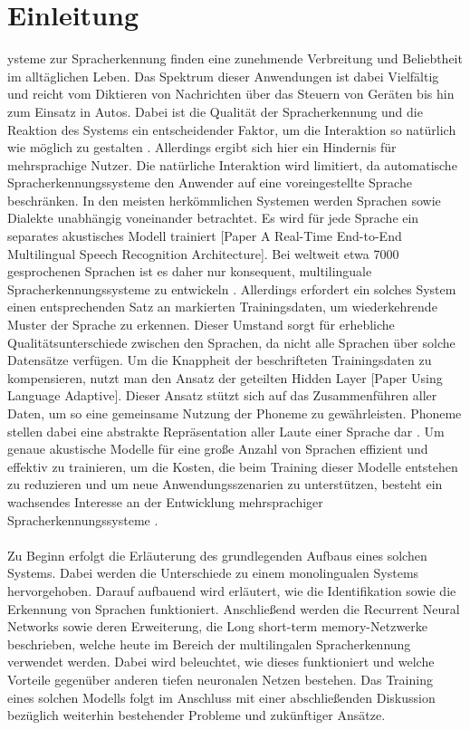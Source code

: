 \section{Einleitung}\label{sec:introduction}
ysteme zur Spracherkennung finden eine zunehmende Verbreitung und Beliebtheit im alltäglichen Leben. Das Spektrum dieser Anwendungen ist dabei Vielfältig und reicht vom Diktieren von Nachrichten über das Steuern von Geräten bis hin zum Einsatz in Autos. Dabei ist die Qualität der Spracherkennung und die Reaktion des Systems ein entscheidender Faktor, um die Interaktion so natürlich wie möglich zu gestalten \cite{Yu.2014}. Allerdings ergibt sich hier ein Hindernis für mehrsprachige Nutzer. Die natürliche Interaktion wird limitiert, da automatische Spracherkennungssysteme den Anwender auf eine voreingestellte Sprache beschränken. In den meisten herkömmlichen Systemen werden Sprachen sowie Dialekte unabhängig voneinander betrachtet. Es wird für jede Sprache ein separates akustisches Modell trainiert [Paper A Real-Time End-to-End Multilingual Speech Recognition Architecture]. Bei weltweit etwa 7000 gesprochenen Sprachen ist es daher nur konsequent, multilinguale Spracherkennungssysteme zu entwickeln \cite{Gary.2018}. Allerdings erfordert ein solches System einen entsprechenden Satz an markierten Trainingsdaten, um wiederkehrende Muster der Sprache zu erkennen. 
Dieser Umstand sorgt für erhebliche Qualitätsunterschiede zwischen den Sprachen, da nicht alle Sprachen über solche Datensätze verfügen. Um die Knappheit der beschrifteten Trainingsdaten zu kompensieren, nutzt man den Ansatz der geteilten Hidden Layer [Paper Using Language Adaptive]. Dieser Ansatz stützt sich auf das Zusammenführen aller Daten, um so eine gemeinsame Nutzung der Phoneme zu gewährleisten.  Phoneme stellen dabei eine abstrakte Repräsentation aller Laute einer Sprache dar . Um genaue akustische Modelle für eine große Anzahl von Sprachen effizient und effektiv zu trainieren, um die Kosten, die beim Training dieser Modelle entstehen zu reduzieren und um neue Anwendungsszenarien zu unterstützen, besteht ein wachsendes Interesse an der Entwicklung mehrsprachiger Spracherkennungssysteme \cite{Yu.2014}. 
\\\\
Zu Beginn erfolgt die Erläuterung des grundlegenden Aufbaus eines solchen Systems. Dabei werden die Unterschiede zu einem monolingualen Systems hervorgehoben. Darauf aufbauend wird erläutert, wie die Identifikation sowie die Erkennung von Sprachen funktioniert. Anschließend werden die Recurrent Neural Networks sowie deren Erweiterung, die Long short-term memory-Netzwerke beschrieben, welche heute im Bereich der multilingalen Spracherkennung verwendet werden. Dabei wird beleuchtet, wie dieses funktioniert und welche Vorteile gegenüber anderen tiefen neuronalen Netzen bestehen. Das Training eines solchen Modells folgt im Anschluss mit einer abschließenden Diskussion bezüglich weiterhin bestehender Probleme und zukünftiger Ansätze.

